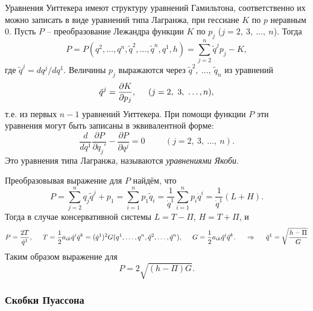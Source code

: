 Уравнения Уиттекера имеют структуру уравнений Гамильтона, соответственно их можно записать в виде уравнений типа Лагранжа, при гессиане $K$ по $p$ неравным 0. Пусть $P$ -- преобразование Лежандра функции $K$ по $p_j$ ($j = 2, \ 3,\ \ldots,\ n$). Тогда
\begin{equation*}
    P = P(q^2, \ldots, q^n, \tilde q^2, \ldots, \tilde q^n, q^1, h) = \sum_{j = 2}^{n} \tilde q^j p_j - K,
\end{equation*}
где $\tilde q^{j} = d q^j / d q^1$. Величины $p_j$ выражаются через $\tilde q^2, \ \ldots, \ \tilde q_n$ из уравнений 
\begin{equation*}
    \tilde q^j = \frac{\partial K}{\partial p_j}, \hspace{0.5cm} 
    (j = 2, \ 3, \ \ldots, n),
\end{equation*}
т.е. из первых $n-1$ уравнений Уиттекера. При помощи функции $P$ эти уравнения могут быть записаны в эквивалентной форме:
\begin{equation*}
    \frac{d }{d q^1} \frac{\partial P}{\partial q_j'} - \frac{\partial P}{\partial q^j} = 0
    \hspace{1cm} (j = 2,\ 3,\ \ldots,\ n).
\end{equation*}
Это уравнения типа Лагранжа, называются \textit{уравнениями Якоби}.

Преобразовывая выражение для $P$ найдём, что
\begin{equation*}
    P = \sum_{j=2}^{n} q_j \tilde q^j + p_1 = 
    \sum_{i=1}^{n} p_1 \tilde q_i = \frac{1}{\dot{q}^1} \sum_{i=1}^{n} p_i \dot{q}^i = \frac{1}{\dot{q}^1} (L+H).
\end{equation*}
Тогда в случае консервативной системы $L = T - \Pi$, $H = T + \Pi$, и
\begin{equation*}
    P = \frac{2T}{\dot{q}^1},
    \hspace{0.5cm} 
    T = \frac{1}{2} a_{ik} \dot{q}^i \dot{q}^k = (\dot{q}^1)^2 G(q^1, \ldots, q^n, \tilde q^2, \ldots, \tilde q^n),
    \hspace{0.5cm} 
    G = \frac{1}{2} a_{ik} \tilde q^i \tilde q^k.
    \hspace{0.5cm} \Rightarrow \hspace{0.5cm} 
    \tilde q^1 = \sqrt{\frac{h-\Pi}{G} }
\end{equation*}
Таким образом выражение для 
\begin{equation*}
    P = 2 \sqrt{(h-\Pi)G }.
\end{equation*}


\subsubsection*{Скобки Пуассона}

